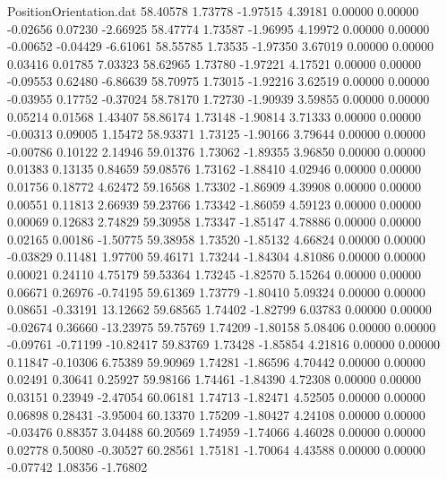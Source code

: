 \begin{filecontents}{PositionOrientation.dat}
  58.40578    1.73778   -1.97515     4.39181    0.00000    0.00000   -0.02656    0.07230   -2.66925
  58.47774    1.73587   -1.96995     4.19972    0.00000    0.00000   -0.00652   -0.04429   -6.61061
  58.55785    1.73535   -1.97350     3.67019    0.00000    0.00000    0.03416    0.01785    7.03323
  58.62965    1.73780   -1.97221     4.17521    0.00000    0.00000   -0.09553    0.62480   -6.86639
  58.70975    1.73015   -1.92216     3.62519    0.00000    0.00000   -0.03955    0.17752   -0.37024
  58.78170    1.72730   -1.90939     3.59855    0.00000    0.00000    0.05214    0.01568    1.43407
  58.86174    1.73148   -1.90814     3.71333    0.00000    0.00000   -0.00313    0.09005    1.15472
  58.93371    1.73125   -1.90166     3.79644    0.00000    0.00000   -0.00786    0.10122    2.14946
  59.01376    1.73062   -1.89355     3.96850    0.00000    0.00000    0.01383    0.13135    0.84659
  59.08576    1.73162   -1.88410     4.02946    0.00000    0.00000    0.01756    0.18772    4.62472
  59.16568    1.73302   -1.86909     4.39908    0.00000    0.00000    0.00551    0.11813    2.66939
  59.23766    1.73342   -1.86059     4.59123    0.00000    0.00000    0.00069    0.12683    2.74829
  59.30958    1.73347   -1.85147     4.78886    0.00000    0.00000    0.02165    0.00186   -1.50775
  59.38958    1.73520   -1.85132     4.66824    0.00000    0.00000   -0.03829    0.11481    1.97700
  59.46171    1.73244   -1.84304     4.81086    0.00000    0.00000    0.00021    0.24110    4.75179
  59.53364    1.73245   -1.82570     5.15264    0.00000    0.00000    0.06671    0.26976   -0.74195
  59.61369    1.73779   -1.80410     5.09324    0.00000    0.00000    0.08651   -0.33191   13.12662
  59.68565    1.74402   -1.82799     6.03783    0.00000    0.00000   -0.02674    0.36660  -13.23975
  59.75769    1.74209   -1.80158     5.08406    0.00000    0.00000   -0.09761   -0.71199  -10.82417
  59.83769    1.73428   -1.85854     4.21816    0.00000    0.00000    0.11847   -0.10306    6.75389
  59.90969    1.74281   -1.86596     4.70442    0.00000    0.00000    0.02491    0.30641    0.25927
  59.98166    1.74461   -1.84390     4.72308    0.00000    0.00000    0.03151    0.23949   -2.47054
  60.06181    1.74713   -1.82471     4.52505    0.00000    0.00000    0.06898    0.28431   -3.95004
  60.13370    1.75209   -1.80427     4.24108    0.00000    0.00000   -0.03476    0.88357    3.04488
  60.20569    1.74959   -1.74066     4.46028    0.00000    0.00000    0.02778    0.50080   -0.30527
  60.28561    1.75181   -1.70064     4.43588    0.00000    0.00000   -0.07742    1.08356   -1.76802

\end{filecontents}
